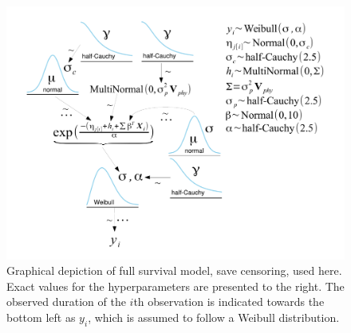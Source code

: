 \documentclass[12pt,letterpaper]{article}
\begin{document}
\begin{figure}
  \centering
  \includegraphics[height = 0.5\textheight, width = \textwidth, keepaspectratio = true]{figure/mammal_survival_model}
  \caption{Graphical depiction of full survival model, save censoring, used here. Exact values for the hyperparameters are presented to the right. The observed duration of the \(i\)th observation is indicated towards the bottom left as \(y_{i}\), which is assumed to follow a Weibull distribution.}
  \label{fig:model_diagram}
\end{figure}
\end{document}
